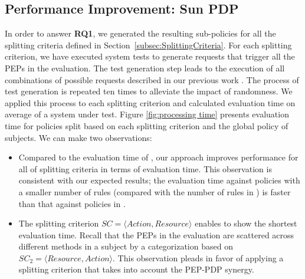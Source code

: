 \subsection{Performance Improvement: Sun PDP}\label{subsec:performanceimprovement}
In order to answer \textbf{RQ1}, we generated the resulting sub-policies for all the splitting criteria defined in 
Section~\ref{subsec:SplittingCriteria}.
For each splitting criterion, we have executed system tests to generate requests that trigger all the PEPs in the evaluation. 
The test generation step leads to the execution of all combinations of possible requests described in our previous work \cite{testcase}.  
The process of test generation is repeated ten times to alleviate the impact of randomness. We applied this process to each splitting criterion and calculated evaluation time on average of a system under test.
Figure \ref{fig:processing time} presents evaluation time for policies split
based on each splitting criterion and the global policy of subjects. We can make two observations:
\begin{itemize}
\item Compared to the evaluation time of , our approach improves performance for all of splitting criteria
in terms of evaluation time. This observation is consistent with our expected results; the evaluation time against
policies with a smaller number of rules (compared with the number of rules in ) is faster than that against
policies in .
\item The splitting criterion \normalsize $SC=\langle Action, Resource\rangle$ enables to show the shortest evaluation time. 
Recall that the PEPs in the evaluation are scattered across different methods in a subject by a categorization 
based on $SC_{2}=\langle Resource,Action\rangle$. This observation pleads in favor of applying a splitting criterion 
that takes into account the PEP-PDP synergy.
\end{itemize}
